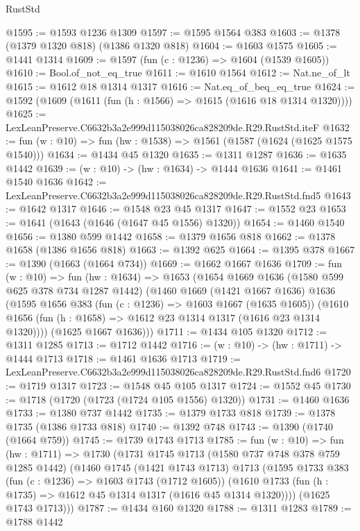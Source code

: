 \begin{lexlean}{RustStd}
\begin{coremodule}
@1595 := @1593 @1236 @1309
@1597 := @1595 @1564 @383
@1603 := @1378 (@1379 @1320 @818) (@1386 @1320 @818)
@1604 := @1603 @1575
@1605 := @1441 @1314
@1609 := @1597 (fun (c : @1236) => @1604 (@1539 @1605))
@1610 := Bool.of_not_eq_true
@1611 := @1610 @1564
@1612 := Nat.ne_of_lt
@1615 := @1612 @18 @1314 @1317
@1616 := Nat.eq_of_beq_eq_true
@1624 := @1592 (@1609 (@1611 (fun (h : @1566) => @1615 (@1616 @18 @1314 @1320))))
@1625 := LexLeanPreserve.C6632b3a2e999d115038026ca828209de.R29.RustStd.iteF
@1632 := fun (w : @10) => fun (hw : @1538) => @1561 (@1587 (@1624 (@1625 @1575 @1540)))
@1634 := @1434 @45 @1320
@1635 := @1311 @1287
@1636 := @1635 @1442
@1639 := (w : @10) -> (hw : @1634) -> @1444 @1636
@1641 := @1461 @1540 @1636
@1642 := LexLeanPreserve.C6632b3a2e999d115038026ca828209de.R29.RustStd.fnd5
@1643 := @1642 @1317
@1646 := @1548 @23 @45 @1317
@1647 := @1552 @23
@1653 := @1641 (@1643 (@1646 (@1647 @45 @1556) @1320))
@1654 := @1460 @1540
@1656 := @1380 @599 @1442
@1658 := @1379 @1656 @818
@1662 := @1378 @1658 (@1386 @1656 @818)
@1663 := @1392 @625
@1664 := @1395 @378
@1667 := @1390 (@1663 (@1664 @734))
@1669 := @1662 @1667 @1636
@1709 := fun (w : @10) =>
  fun (hw : @1634) =>
  @1653
    (@1654
      @1669
      @1636
      (@1580 @599 @625 @378 @734 @1287 @1442)
      (@1460
        @1669
        (@1421 @1667 @1636)
        @1636
        (@1595
          @1656
          @383
          (fun (c : @1236) => @1603 @1667 (@1635 @1605))
          (@1610 @1656 (fun (h : @1658) => @1612 @23 @1314 @1317 (@1616 @23 @1314 @1320))))
        (@1625 @1667 @1636)))
@1711 := @1434 @105 @1320
@1712 := @1311 @1285
@1713 := @1712 @1442
@1716 := (w : @10) -> (hw : @1711) -> @1444 @1713
@1718 := @1461 @1636 @1713
@1719 := LexLeanPreserve.C6632b3a2e999d115038026ca828209de.R29.RustStd.fnd6
@1720 := @1719 @1317
@1723 := @1548 @45 @105 @1317
@1724 := @1552 @45
@1730 := @1718 (@1720 (@1723 (@1724 @105 @1556) @1320))
@1731 := @1460 @1636
@1733 := @1380 @737 @1442
@1735 := @1379 @1733 @818
@1739 := @1378 @1735 (@1386 @1733 @818)
@1740 := @1392 @748
@1743 := @1390 (@1740 (@1664 @759))
@1745 := @1739 @1743 @1713
@1785 := fun (w : @10) =>
  fun (hw : @1711) =>
  @1730
    (@1731
      @1745
      @1713
      (@1580 @737 @748 @378 @759 @1285 @1442)
      (@1460
        @1745
        (@1421 @1743 @1713)
        @1713
        (@1595
          @1733
          @383
          (fun (c : @1236) => @1603 @1743 (@1712 @1605))
          (@1610 @1733 (fun (h : @1735) => @1612 @45 @1314 @1317 (@1616 @45 @1314 @1320))))
        (@1625 @1743 @1713)))
@1787 := @1434 @160 @1320
@1788 := @1311 @1283
@1789 := @1788 @1442

\end{coremodule}
\end{lexlean}
